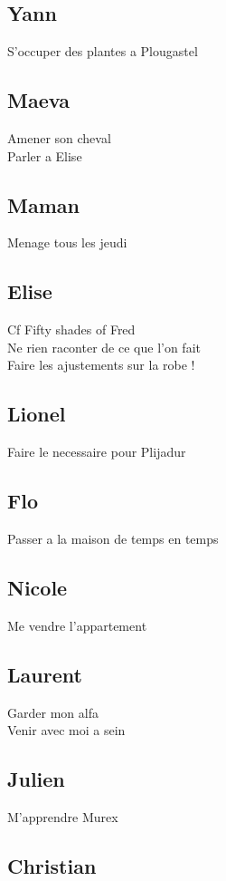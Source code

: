\documentclass[8pt]{article} %
\begin{document}
\subsection{Yann}
	S'occuper des plantes a Plougastel\\
\subsection{Maeva}
	Amener son cheval\\
	Parler a Elise\\
\subsection{Maman}
	Menage tous les jeudi\\
\subsection{Elise}
	Cf Fifty shades of Fred\\
	Ne rien raconter de ce que l'on fait\\
	Faire les ajustements sur la robe !\\
\subsection{Lionel}
	Faire le necessaire pour Plijadur\\
\subsection{Flo}
	Passer a la maison de temps en temps\\
\subsection{Nicole}
	Me vendre l'appartement \\
\subsection{Laurent}
	Garder mon alfa\\
	Venir avec moi a sein\\
\subsection{Julien}
	M'apprendre Murex\\
	
\subsection{Christian}
\end{document}
